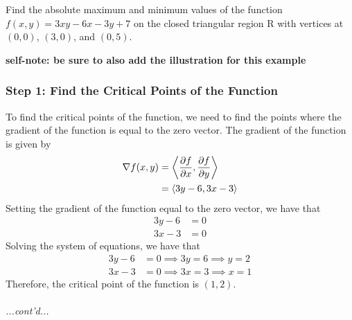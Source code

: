 \documentclass{article}
\begin{document}
\begin{examplebox}
    Find the absolute maximum and minimum values of the function \( f(x, y) = 3xy - 6x - 3y + 7 \) on the closed triangular region R with vertices at \( (0, 0) \), \( (3, 0) \), and \( (0, 5) \).

    \textbf{self-note: be sure to also add the illustration for this example}

    \begin{solutionbox}
        \subsubsection*{Step 1: Find the Critical Points of the Function}
        To find the critical points of the function, we need to find the points where the gradient of the function is equal to the zero vector. The gradient of the function is given by
        \begin{align*}
            \nabla f(x, y) &= \left \langle \pdv{f}{x}, \pdv{f}{y} \right \rangle \\
            &= \left \langle 3y - 6, 3x - 3 \right \rangle
        \end{align*}
        Setting the gradient of the function equal to the zero vector, we have that
        \begin{align*}
            3y - 6 &= 0 \\
            3x - 3 &= 0
        \end{align*}
        Solving the system of equations, we have that
        \begin{align*}
            3y - 6 &= 0 \implies 3y = 6 \implies y = 2 \\
            3x - 3 &= 0 \implies 3x = 3 \implies x = 1
        \end{align*}
        Therefore, the critical point of the function is \( (1, 2) \). \\
        \\
        \textit{...cont'd...}
    \end{solutionbox}
\end{examplebox}
\end{document}
